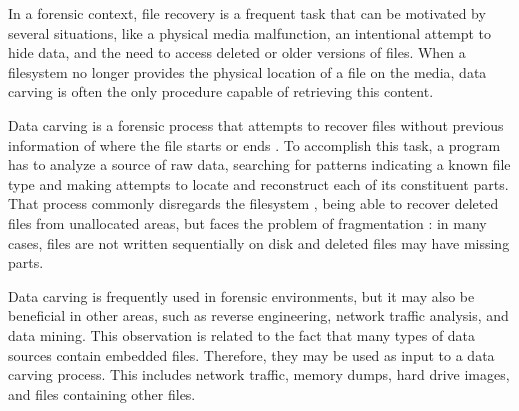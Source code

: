 In a forensic context, file recovery is a frequent task that can be motivated by several situations, like a physical media malfunction, an intentional attempt to hide data, and the need to access deleted or older versions of files. When a filesystem no longer provides the physical location of a file on the media, data carving is often the only procedure capable of retrieving this content.

Data carving is a forensic process that attempts to recover files without previous information of where the file starts or ends \cite{garfinkel_carving_2007}.
To accomplish this task, a program has to analyze a source of raw data, searching for patterns indicating a known file type and making attempts to locate and reconstruct each of its constituent parts.
That process commonly disregards the filesystem \cite{veenman_statistical_2007}, being able to recover deleted files from unallocated areas, but faces the problem of fragmentation \cite{veenman_statistical_2007}  \cite{pal_evolution_2009}: in many cases, files are not written sequentially on disk and deleted files may have missing parts.

Data carving is frequently used in forensic environments, but it may also be beneficial in other areas, such as reverse engineering, network traffic analysis, and data mining.
This observation is related to the fact that many types of data sources contain embedded files. Therefore, they may be used as input to a data carving process. This includes network traffic, memory dumps, hard drive images, and files containing other files.
